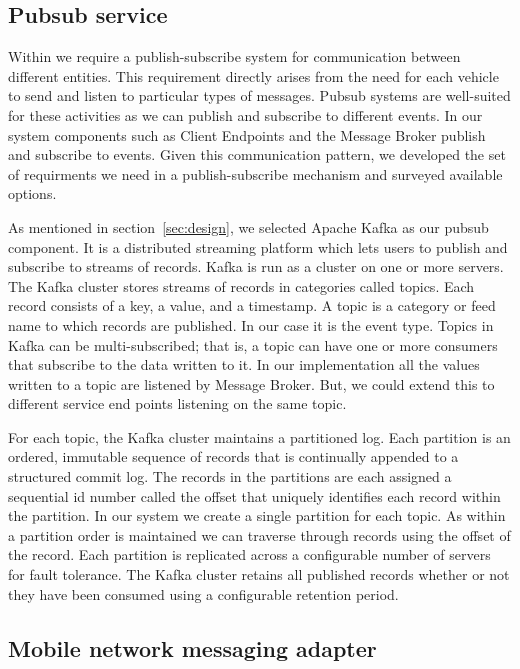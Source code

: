 \subsection{Pubsub service}

Within \name{} we require a publish-subscribe system for communication
between different entities.  This requirement directly arises from the
need for each vehicle to send and listen to particular types of
messages. Pubsub systems are well-suited for these activities as we
can publish and subscribe to different events. In our system
components such as Client Endpoints and the Message Broker publish and
subscribe to events.  Given this communication pattern, we developed
the set of requirments we need in a publish-subscribe mechanism and
surveyed available options.

As mentioned in section~\ref{sec:design}, we selected Apache Kafka as our pubsub
component. It is a distributed streaming platform which lets users to publish 
and subscribe to streams of records. Kafka is run as a cluster on one or more 
servers. The Kafka cluster stores streams of records in categories called topics.
Each record consists of a key, a value, and a timestamp. A topic is a category 
or feed name to which records are published. In our case it is the event type.
Topics in Kafka can be multi-subscribed; that is, a topic can have one or more 
consumers that subscribe to the data written to it. In our implementation
all the values written to a topic are listened by Message Broker. But, we could
extend this to different service end points listening on the same topic.

For each topic, the Kafka cluster maintains a partitioned log. Each partition 
is an ordered, immutable sequence of records that is continually appended to a 
structured commit log. The records in the partitions are each assigned a 
sequential id number called the offset that uniquely identifies each record 
within the partition. In our system we create a single partition for each topic.
As within a partition order is maintained we can traverse through records using
the offset of the record. Each partition is replicated across a configurable
number of servers for fault tolerance. The Kafka cluster retains all published 
records whether or not they have been consumed using a configurable retention 
period.

\subsection{Mobile network messaging adapter}

